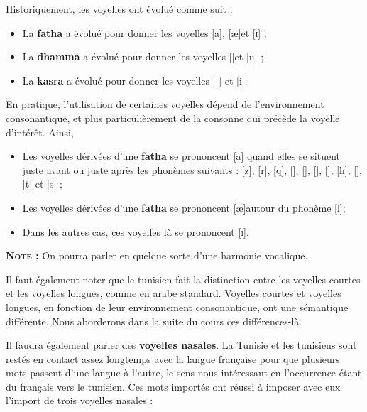 Historiquement, les voyelles ont évolué comme suit :
\begin{itemize}
    \item La \textbf{fatha} a évolué pour donner les voyelles [a], [\ae]\texttildelow[\textepsilon] et [\textsc{i}] ;
    \item La \textbf{dhamma} a évolué pour donner les voyelles [\textopeno]\texttildelow[\textupsilon] et [u] ;
    \item La \textbf{kasra} a évolué pour donner les voyelles [ \textschwa] et [i].
\end{itemize}

En pratique, l'utilisation de certaines voyelles dépend de l'environnement consonantique, et plus particulièrement de la consonne qui précède la voyelle d'intérêt. Ainsi, 

\begin{itemize}
    \item Les voyelles dérivées d'une \textbf{fatha} se prononcent [a] quand elles se situent juste avant ou juste après les phonèmes suivants :  [z],  [r],  [q],  [\textchi],  [\textinvscr],  [\texthth],  [\textrevglotstop],  [h],  [\dh \super\textrevglotstop],  [t\super\textrevglotstop] et  [s\super\textrevglotstop] ;
    \item Les voyelles dérivées d'une \textbf{fatha} se prononcent [\ae]\texttildelow[\textepsilon] autour du  phonème  [l];
    \item Dans les autres cas, ces voyelles là se prononcent [\textsc{i}].
\end{itemize}

\textbf{\textsc{Note} :} On pourra parler en quelque sorte d'une harmonie vocalique.

Il faut également noter que le tunisien fait la distinction entre les voyelles courtes et les voyelles longues, comme en arabe standard. Voyelles courtes et voyelles longues, en fonction de leur environnement consonantique, ont une sémantique différente. Nous aborderons dans la suite du cours ces différences-là.

Il faudra également parler des \textbf{voyelles nasales}. La Tunisie et les tunisiens sont restés en contact assez longtemps avec la langue française pour que plusieurs mots passent d'une langue à l'autre, le sens nous intéressant en l'occurrence étant du français vers le tunisien. Ces mots importés ont réussi à imposer avec eux l'import de trois voyelles nasales : 

